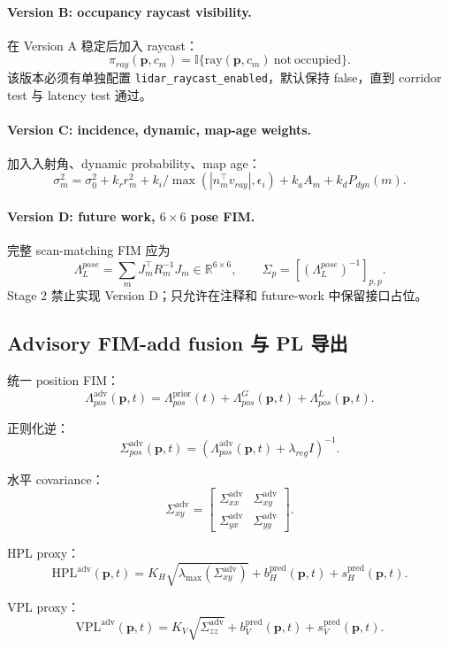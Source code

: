 \documentclass[11pt,a4paper]{article}
\newcommand{\HPL}{\mathrm{HPL}}
\newcommand{\VPL}{\mathrm{VPL}}
\newcommand{\Lam}{\Lambda}
\newcommand{\Sig}{\Sigma}
\newcommand{\pvec}{\mathbf{p}}
\newcommand{\adv}{\mathrm{adv}}
\newcommand{\prior}{\mathrm{prior}}
\newcommand{\pred}{\mathrm{pred}}
\begin{document}
\paragraph{Version B: occupancy raycast visibility.}
在 Version A 稳定后加入 raycast：
\[
  \pi_{ray}(\pvec,c_m)=\mathbb{I}\{\mathrm{ray}(\pvec,c_m)\ \mathrm{not\ occupied}\}.
\]
该版本必须有单独配置 \texttt{lidar\_raycast\_enabled}，默认保持 false，直到 corridor test 与 latency test 通过。

\paragraph{Version C: incidence, dynamic, map-age weights.}
加入入射角、dynamic probability、map age：
\[
  \sigma_m^2=\sigma_0^2+k_r r_m^2+k_i/\max(|n_m^\top v_{ray}|,\epsilon_i)+k_a A_m+k_dP_{dyn}(m).
\]

\paragraph{Version D: future work, $6\times6$ pose FIM.}
完整 scan-matching FIM 应为
\[
  \Lam_L^{pose}=\sum_m J_m^\top R_m^{-1}J_m\in\mathbb{R}^{6\times6},
  \qquad
  \Sigma_p=[(\Lam_L^{pose})^{-1}]_{p,p}.
\]
Stage 2 禁止实现 Version D；只允许在注释和 future-work 中保留接口占位。

\subsection{Advisory FIM-add fusion 与 PL 导出}

统一 position FIM：
\[
  \boxed{
    \Lam^{\adv}_{pos}(\pvec,t)
    =\Lam^{\prior}_{pos}(t)
    +\Lam^G_{pos}(\pvec,t)
    +\Lam^L_{pos}(\pvec,t).
  }
\]

正则化逆：
\[
  \boxed{
    \Sig^{\adv}_{pos}(\pvec,t)
    =\left(\Lam^{\adv}_{pos}(\pvec,t)+\lambda_{reg}I\right)^{-1}.
  }
\]

水平 covariance：
\[
  \Sig^{\adv}_{xy}=\begin{bmatrix}
  \Sig^{\adv}_{xx} & \Sig^{\adv}_{xy}\\
  \Sig^{\adv}_{yx} & \Sig^{\adv}_{yy}
\end{bmatrix}.
\]

HPL proxy：
\[
\boxed{
  \HPL^{\adv}(\pvec,t)
  =
  K_H\sqrt{\lambda_{\max}(\Sig^{\adv}_{xy})}
  +b_H^{\pred}(\pvec,t)+s_H^{\pred}(\pvec,t).
}
\]

VPL proxy：
\[
\boxed{
  \VPL^{\adv}(\pvec,t)
  =
  K_V\sqrt{\Sig^{\adv}_{zz}}
  +b_V^{\pred}(\pvec,t)+s_V^{\pred}(\pvec,t).
}
\]
\end{document}
